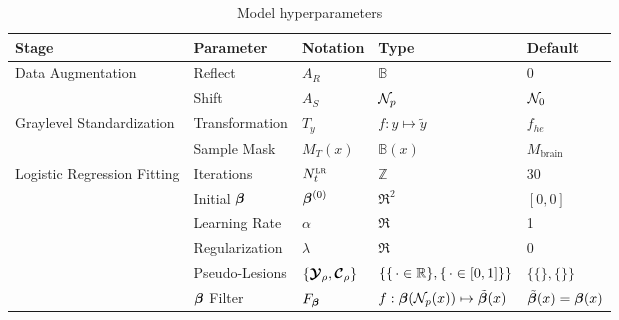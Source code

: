 \begin{table}
  \centering
  \caption{Model hyperparameters}
  \label{tab:hyperparams}
  \begin{tabular}{lllll}
  	\hline
  	Stage                                        & Parameter        & Notation                    & Type                                          & Default                   \\ \hline
  	\multirow{2}{*}{Data Augmentation}           & Reflect          & $A_R$                       & $\mathbb{B}$                                  & 0                         \\
  	                                             & Shift            & $A_S$                       & $\mathcal{N}_p$                                        & $\mathcal{N}_0$                    \\ \hline
  	\multirow{2}{*}{Graylevel Standardization}   & Transformation   & $T_y$                       & $f: y\mapsto \tilde{y}$                       & $f_{he}$                  \\
  	                                             & Sample Mask      & $M_{T}(x)$                  & $\mathbb{B}(x)$                               & $M_{\text{brain}}$        \\ \hline
  	\multirow{6}{*}{Logistic Regression Fitting} & Iterations       & $N_{t}^{\textsc{lr}}$               & $\mathbb{Z}$                                  & 30                        \\
  	                                             & Initial $\bm{\beta}$    & $\bm{\beta}^{(0)}$                 & $\Re^2$                                       & $[0,0]$                   \\
  	                                             & Learning Rate    & $\alpha$                    & $\Re$                                         & 1                         \\
  	                                             & Regularization   & $\lambda$                   & $\Re$                                         & 0                         \\
  	                                             & Pseudo-Lesions   & $\{\bm{\mathcal{Y}}_{\rho},\bm{\mathcal{C}}_{\rho}\}$ & $\{\{\thinspace\cdot\in\mathbb{R}\},\{\thinspace\cdot\in[0,1]\}\}$ & $\{\{\},\{\}\}$           \\
  	                                             & $\bm{\beta}$ Filter     & $F_{\bm{\beta}}$                   & $f: \bm{\beta}(\mathcal{N}_p(x)) \mapsto \tilde{\bm{\beta}}(x)$      & $\tilde{\bm{\beta}}(x) = \bm{\beta}(x)$ \\ \hline

\end{tabular}
\end{table}
